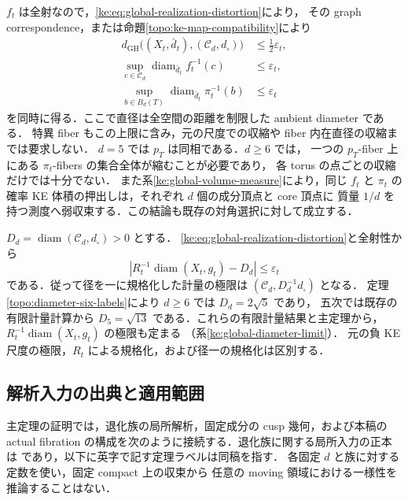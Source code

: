 $f_t$ は全射なので，\eqref{ke:eq:global-realization-distortion}により，
その graph correspondence，または命題\ref{topo:ke-map-compatibility}により
\begin{align*}
 d_{\mathrm{GH}}\bigl((X_t,\bar d_t),(\mathcal C_d,d_\square)\bigr)
 &\le\tfrac12\varepsilon_t,\\
 \sup_{c\in\mathcal C_d}
 \operatorname{diam}_{\bar d_t}f_t^{-1}(c)
 &\le\varepsilon_t,\\
 \sup_{b\in B_d(T)}
 \operatorname{diam}_{\bar d_t}\pi_t^{-1}(b)
 &\le\varepsilon_t
\end{align*}
を同時に得る．ここで直径は全空間の距離を制限した ambient diameter である．
特異 fiber もこの上限に含み，元の尺度での収縮や fiber 内在直径の収縮までは要求しない．
$d=5$ では $p_T$ は同相である．$d\ge6$ では，
一つの $p_T$-fiber 上にある $\pi_t$-fibers の集合全体が縮むことが必要であり，
各 torus の点ごとの収縮だけでは十分でない．
また系\ref{ke:global-volume-measure}により，同じ $f_t$ と $\pi_t$ の
確率 KE 体積の押出しは，それぞれ $d$ 個の成分頂点と core 頂点に
質量 $1/d$ を持つ測度へ弱収束する．この結論も既存の対角選択に対して成立する．

\begin{remark}[径を一にする規格化との関係]
\label{ke:global-realization-scale}
$D_d=\operatorname{diam}(\mathcal C_d,d_\square)>0$ とする．
\eqref{ke:eq:global-realization-distortion}と全射性から
\[
 \left|R_t^{-1}\operatorname{diam}(X_t,g_t)-D_d\right|
 \le\varepsilon_t
\]
である．従って径を一に規格化した計量の極限は
$(\mathcal C_d,D_d^{-1}d_\square)$ となる．
定理\ref{topo:diameter-six-labels}により $d\ge6$ では $D_d=2\sqrt5$ であり，
五次では既存の有限計量計算\cite[\texttt{thm:intro-diameter-C5}]{KECubicalCurrent}から
$D_5=\sqrt{13}$ である．これらの有限計量結果と主定理から，
$R_t^{-1}\operatorname{diam}(X_t,g_t)$ の極限も定まる
（系\ref{ke:global-diameter-limit}）．
元の負 KE 尺度の極限，$R_t$ による規格化，および径一の規格化は区別する．
\end{remark}

\subsection{解析入力の出典と適用範囲}
\label{ke:global-realization-transfer}
\label{ke:proof-inputs}

主定理の証明では，退化族の局所解析，固定成分の cusp 幾何，および本稿の
actual fibration の構成を次のように接続する．退化族に関する局所入力の正本は
\cite[Part~IV]{KELocalCurrent}であり，以下に英字で記す定理ラベルは同稿を指す．
各固定 $d$ と族に対する定数を使い，固定 compact 上の収束から
任意の moving 領域における一様性を推論することはない．

